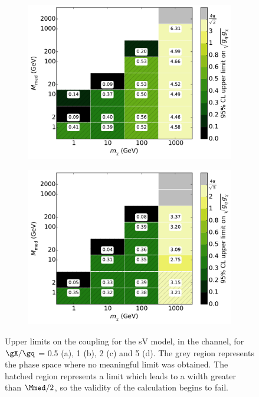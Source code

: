 \begin{figure}[t]
\begin{subfigure}[t]{0.495\textwidth}
      \caption{}
    \end{subfigure}
    \begin{subfigure}[t]{0.495\textwidth}
      \centering
      \includegraphics[width=1.\textwidth]{figures/grid_basepoints_SVD_rat2_monojet.pdf}
      \caption{}
    \end{subfigure}
    \begin{subfigure}[t]{0.495\textwidth}
      \centering
      \includegraphics[width=1.\textwidth]{figures/grid_basepoints_SVD_rat5_monojet.pdf}
      \caption{}
    \end{subfigure}
    \caption{Upper limits on the coupling for the sV model, in the \monojet channel, for $\gX / \gq$ = 0.5 (a), 1 (b), 2 (c) and 5 (d). The grey region represents the phase space where no meaningful limit was obtained. The hatched region represents a limit which leads to a width greater than $\Mmed / 2$, so the validity of the calculation begins to fail.}
    \label{fig:Monojet_SVD_couplinglimit}
\end{figure}

